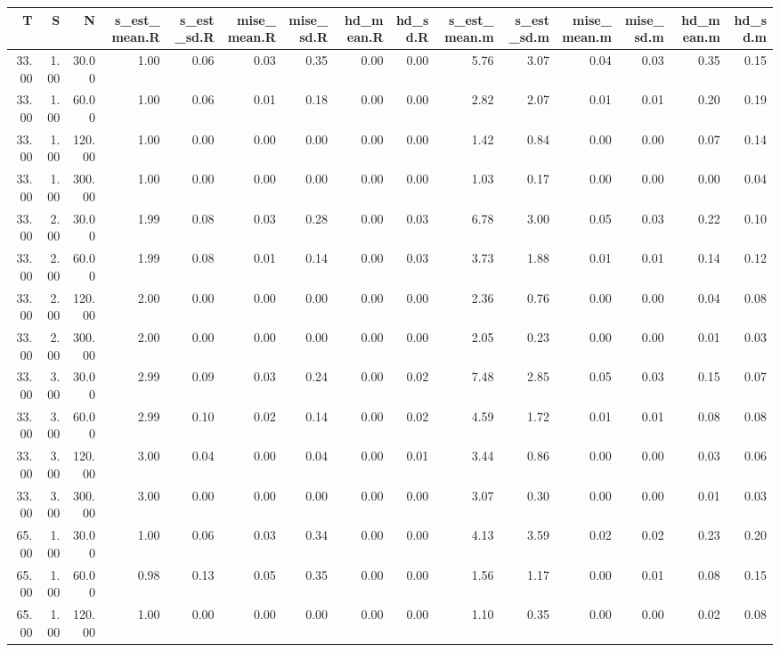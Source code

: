 \begin{table}[ht]
\centering
\begin{tabular}{rrrrrrrrrrrrrrr}
  \hline
T & S & N & s\_est\_mean.R & s\_est\_sd.R & mise\_mean.R & mise\_sd.R & hd\_mean.R & hd\_sd.R & s\_est\_mean.m & s\_est\_sd.m & mise\_mean.m & mise\_sd.m & hd\_mean.m & hd\_sd.m \\ 
  \hline
33.00 & 1.00 & 30.00 & 1.00 & 0.06 & 0.03 & 0.35 & 0.00 & 0.00 & 5.76 & 3.07 & 0.04 & 0.03 & 0.35 & 0.15 \\ 
  33.00 & 1.00 & 60.00 & 1.00 & 0.06 & 0.01 & 0.18 & 0.00 & 0.00 & 2.82 & 2.07 & 0.01 & 0.01 & 0.20 & 0.19 \\ 
  33.00 & 1.00 & 120.00 & 1.00 & 0.00 & 0.00 & 0.00 & 0.00 & 0.00 & 1.42 & 0.84 & 0.00 & 0.00 & 0.07 & 0.14 \\ 
  33.00 & 1.00 & 300.00 & 1.00 & 0.00 & 0.00 & 0.00 & 0.00 & 0.00 & 1.03 & 0.17 & 0.00 & 0.00 & 0.00 & 0.04 \\ 
  33.00 & 2.00 & 30.00 & 1.99 & 0.08 & 0.03 & 0.28 & 0.00 & 0.03 & 6.78 & 3.00 & 0.05 & 0.03 & 0.22 & 0.10 \\ 
  33.00 & 2.00 & 60.00 & 1.99 & 0.08 & 0.01 & 0.14 & 0.00 & 0.03 & 3.73 & 1.88 & 0.01 & 0.01 & 0.14 & 0.12 \\ 
  33.00 & 2.00 & 120.00 & 2.00 & 0.00 & 0.00 & 0.00 & 0.00 & 0.00 & 2.36 & 0.76 & 0.00 & 0.00 & 0.04 & 0.08 \\ 
  33.00 & 2.00 & 300.00 & 2.00 & 0.00 & 0.00 & 0.00 & 0.00 & 0.00 & 2.05 & 0.23 & 0.00 & 0.00 & 0.01 & 0.03 \\ 
  33.00 & 3.00 & 30.00 & 2.99 & 0.09 & 0.03 & 0.24 & 0.00 & 0.02 & 7.48 & 2.85 & 0.05 & 0.03 & 0.15 & 0.07 \\ 
  33.00 & 3.00 & 60.00 & 2.99 & 0.10 & 0.02 & 0.14 & 0.00 & 0.02 & 4.59 & 1.72 & 0.01 & 0.01 & 0.08 & 0.08 \\ 
  33.00 & 3.00 & 120.00 & 3.00 & 0.04 & 0.00 & 0.04 & 0.00 & 0.01 & 3.44 & 0.86 & 0.00 & 0.00 & 0.03 & 0.06 \\ 
  33.00 & 3.00 & 300.00 & 3.00 & 0.00 & 0.00 & 0.00 & 0.00 & 0.00 & 3.07 & 0.30 & 0.00 & 0.00 & 0.01 & 0.03 \\ 
  65.00 & 1.00 & 30.00 & 1.00 & 0.06 & 0.03 & 0.34 & 0.00 & 0.00 & 4.13 & 3.59 & 0.02 & 0.02 & 0.23 & 0.20 \\ 
  65.00 & 1.00 & 60.00 & 0.98 & 0.13 & 0.05 & 0.35 & 0.00 & 0.00 & 1.56 & 1.17 & 0.00 & 0.01 & 0.08 & 0.15 \\ 
  65.00 & 1.00 & 120.00 & 1.00 & 0.00 & 0.00 & 0.00 & 0.00 & 0.00 & 1.10 & 0.35 & 0.00 & 0.00 & 0.02 & 0.08 \\ 

\end{tabular}
\end{table}
